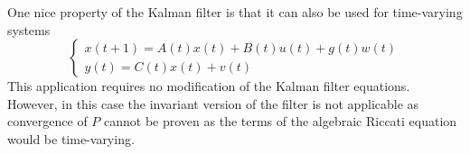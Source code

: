 \documentclass{book}
\theoremstyle{definition}
\theoremstyle{remark}
\theoremstyle{remark}
\begin{document}
One nice property of the Kalman filter is that it can also be used for time-varying systems
\[
    \begin{cases}
        x(t+1)=A(t)x(t)+B(t)u(t)+g(t)w(t)\\
        y(t)=C(t)x(t)+v(t)
    \end{cases}
\]
This application requires no modification of the Kalman filter equations. However, in this case the invariant version of the filter is not applicable as convergence of $P$ cannot be proven as the terms of the algebraic Riccati equation would be time-varying.
\end{document}
